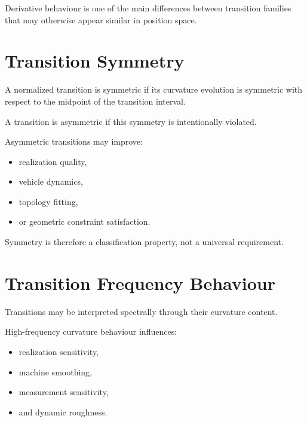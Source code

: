 Derivative behaviour is one of the main differences between transition
families that may otherwise appear similar in position space.

\section{Transition Symmetry}

\begin{definition}
\label{def:transition-symmetry}
A normalized transition is symmetric if its curvature evolution is
symmetric with respect to the midpoint of the transition interval.
\end{definition}

\begin{definition}
\label{def:transition-asymmetry}
A transition is asymmetric if this symmetry is intentionally violated.
\end{definition}

Asymmetric transitions may improve:
\begin{itemize}
\item realization quality,
\item vehicle dynamics,
\item topology fitting,
\item or geometric constraint satisfaction.
\end{itemize}

Symmetry is therefore a classification property, not a universal
requirement.

\section{Transition Frequency Behaviour}

Transitions may be interpreted spectrally through their curvature
content.

High-frequency curvature behaviour influences:
\begin{itemize}
\item realization sensitivity,
\item machine smoothing,
\item measurement sensitivity,
\item and dynamic roughness.
\end{itemize}

